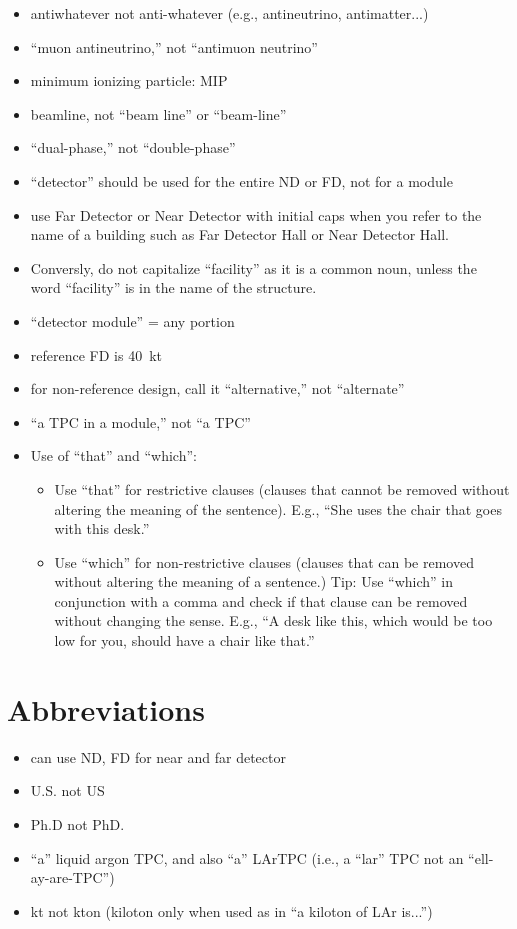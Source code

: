 \begin{itemize}
\item antiwhatever not anti-whatever (e.g., antineutrino, antimatter...)
\item ``muon antineutrino,'' not ``antimuon neutrino''
\item minimum ionizing particle: MIP
\item beamline, not ``beam line'' or ``beam-line''
\item ``dual-phase,'' not ``double-phase''
\item ``detector'' should be used for the entire ND or FD, not for a module
\item use Far Detector or Near Detector with initial caps when you refer to the name of a building such as Far Detector Hall or Near Detector Hall. \item Conversly, do not capitalize ``facility'' as it is a common noun, unless the word ``facility'' is in the name of the structure.
\item ``detector module'' = any  portion
\item reference FD is \SI{40}{kt}
\item for non-reference design, call it ``alternative,'' not ``alternate''
\item ``a TPC in a  module,'' not ``a   TPC'' 
\item Use of ``that'' and ``which'': 
\begin{itemize}
\item Use ``that'' for restrictive clauses (clauses that cannot be removed without altering the meaning of the sentence). E.g., ``She uses the chair that goes with this desk.''
\item Use ``which'' for non-restrictive clauses (clauses that can be removed without altering the meaning of a sentence.) Tip: Use ``which'' in conjunction with a comma and check if that clause can be removed without changing the sense.  E.g., ``A desk like this, which would be too low for you, should have a chair like that.''
\end{itemize}
\end{itemize}

\section{Abbreviations}
\label{sec:abbrevs}

\begin{itemize}
\item can use ND, FD for near and far detector
\item U.S. not US
\item Ph.D not PhD.
\item ``a'' liquid argon TPC, and also ``a'' LArTPC (i.e., a ``lar'' TPC not an ``ell-ay-are-TPC'') 
\item \si{kt} not \si{kton} (kiloton only when used as in ``a kiloton of LAr is...'') 

\end{itemize}

